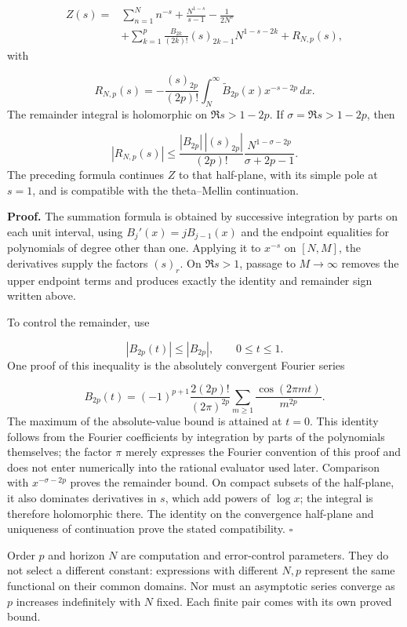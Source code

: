 \[
\begin{aligned}
Z(s)={}&\sum_{n=1}^N n^{-s}+\frac{N^{1-s}}{s-1}-\frac1{2N^s}\\
&+\sum_{k=1}^p\frac{B_{2k}}{(2k)!}(s)_{2k-1}N^{1-s-2k}
+R_{N,p}(s),
\end{aligned}
\]
with

\[
R_{N,p}(s)=-\frac{(s)_{2p}}{(2p)!}
\int_N^\infty\widetilde B_{2p}(x)x^{-s-2p}\,dx.
\]
The remainder integral is holomorphic on \(\Re s>1-2p\). If \(\sigma=\Re s>1-2p\), then

\[
|R_{N,p}(s)|\leq
\frac{|B_{2p}|\,|(s)_{2p}|}{(2p)!}
\frac{N^{1-\sigma-2p}}{\sigma+2p-1}.
\]
The preceding formula continues \(Z\) to that half-plane, with its simple pole at \(s=1\), and is compatible with the theta–Mellin continuation.

\textbf{Proof.} The summation formula is obtained by successive integration by parts on each unit interval, using \(B_j'(x)=jB_{j-1}(x)\) and the endpoint equalities for polynomials of degree other than one. Applying it to \(x^{-s}\) on \([N,M]\), the derivatives supply the factors \((s)_r\). On \(\Re s>1\), passage to \(M\to\infty\) removes the upper endpoint terms and produces exactly the identity and remainder sign written above.

To control the remainder, use

\[
|B_{2p}(t)|\leq |B_{2p}|,\qquad 0\leq t\leq1.
\]
One proof of this inequality is the absolutely convergent Fourier series

\[
B_{2p}(t)=(-1)^{p+1}\frac{2(2p)!}{(2\pi)^{2p}}
\sum_{m\geq1}\frac{\cos(2\pi mt)}{m^{2p}}.
\]
The maximum of the absolute-value bound is attained at \(t=0\). This identity follows from the Fourier coefficients by integration by parts of the polynomials themselves; the factor \(\pi\) merely expresses the Fourier convention of this proof and does not enter numerically into the rational evaluator used later. Comparison with \(x^{-\sigma-2p}\) proves the remainder bound. On compact subsets of the half-plane, it also dominates derivatives in \(s\), which add powers of \(\log x\); the integral is therefore holomorphic there. The identity on the convergence half-plane and uniqueness of continuation prove the stated compatibility. \hfill\(\square\)

Order \(p\) and horizon \(N\) are computation and error-control parameters. They do not select a different constant: expressions with different \(N,p\) represent the same functional on their common domains. Nor must an asymptotic series converge as \(p\) increases indefinitely with \(N\) fixed. Each finite pair comes with its own proved bound.

